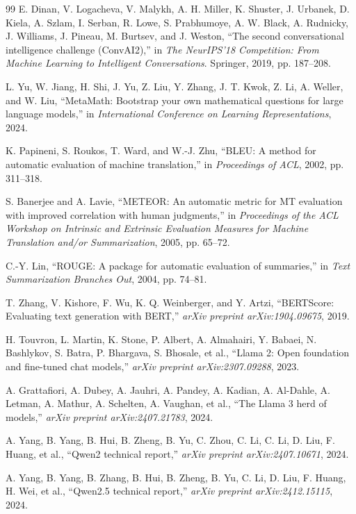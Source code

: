﻿\documentclass[UTF8,a4paper,11pt]{ctexart}
\begin{document}
\begin{thebibliography}{99}
E. Dinan, V. Logacheva, V. Malykh, A. H. Miller, K. Shuster, J. Urbanek, D. Kiela, A. Szlam, I. Serban, R. Lowe, S. Prabhumoye, A. W. Black, A. Rudnicky, J. Williams, J. Pineau, M. Burtsev, and J. Weston, ``The second conversational intelligence challenge (ConvAI2),'' in \emph{The NeurIPS'18 Competition: From Machine Learning to Intelligent Conversations}. Springer, 2019, pp. 187--208.

L. Yu, W. Jiang, H. Shi, J. Yu, Z. Liu, Y. Zhang, J. T. Kwok, Z. Li, A. Weller, and W. Liu, ``MetaMath: Bootstrap your own mathematical questions for large language models,'' in \emph{International Conference on Learning Representations}, 2024.

K. Papineni, S. Roukos, T. Ward, and W.-J. Zhu, ``BLEU: A method for automatic evaluation of machine translation,'' in \emph{Proceedings of ACL}, 2002, pp. 311--318.

S. Banerjee and A. Lavie, ``METEOR: An automatic metric for MT evaluation with improved correlation with human judgments,'' in \emph{Proceedings of the ACL Workshop on Intrinsic and Extrinsic Evaluation Measures for Machine Translation and/or Summarization}, 2005, pp. 65--72.

C.-Y. Lin, ``ROUGE: A package for automatic evaluation of summaries,'' in \emph{Text Summarization Branches Out}, 2004, pp. 74--81.

T. Zhang, V. Kishore, F. Wu, K. Q. Weinberger, and Y. Artzi, ``BERTScore: Evaluating text generation with BERT,'' \emph{arXiv preprint arXiv:1904.09675}, 2019.

H. Touvron, L. Martin, K. Stone, P. Albert, A. Almahairi, Y. Babaei, N. Bashlykov, S. Batra, P. Bhargava, S. Bhosale, et al., ``Llama 2: Open foundation and fine-tuned chat models,'' \emph{arXiv preprint arXiv:2307.09288}, 2023.

A. Grattafiori, A. Dubey, A. Jauhri, A. Pandey, A. Kadian, A. Al-Dahle, A. Letman, A. Mathur, A. Schelten, A. Vaughan, et al., ``The Llama 3 herd of models,'' \emph{arXiv preprint arXiv:2407.21783}, 2024.

A. Yang, B. Yang, B. Hui, B. Zheng, B. Yu, C. Zhou, C. Li, C. Li, D. Liu, F. Huang, et al., ``Qwen2 technical report,'' \emph{arXiv preprint arXiv:2407.10671}, 2024.

A. Yang, B. Yang, B. Zhang, B. Hui, B. Zheng, B. Yu, C. Li, D. Liu, F. Huang, H. Wei, et al., ``Qwen2.5 technical report,'' \emph{arXiv preprint arXiv:2412.15115}, 2024.

\end{thebibliography}
\end{document}
